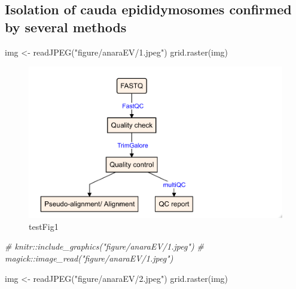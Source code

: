 \documentclass[12pt,twoside]{reedthesis}
\newenvironment{Shaded}{\begin{snugshade}}{\end{snugshade}}
\newcommand{\CommentTok}[1]{\textcolor[rgb]{0.56,0.35,0.01}{\textit{#1}}}
\newcommand{\FunctionTok}[1]{\textcolor[rgb]{0.00,0.00,0.00}{#1}}
\newcommand{\NormalTok}[1]{#1}
\newcommand{\OtherTok}[1]{\textcolor[rgb]{0.56,0.35,0.01}{#1}}
\newcommand{\StringTok}[1]{\textcolor[rgb]{0.31,0.60,0.02}{#1}}
\begin{document}
\hypertarget{isolation-of-cauda-epididymosomes-confirmed-by-several-methods}{%
\subsection{Isolation of cauda epididymosomes confirmed by several methods}\label{isolation-of-cauda-epididymosomes-confirmed-by-several-methods}}
\begin{Shaded}
\begin{Highlighting}[]
\NormalTok{img }\OtherTok{\textless{}{-}} \FunctionTok{readJPEG}\NormalTok{(}\StringTok{"figure/anaraEV/1.jpeg"}\NormalTok{)}
\FunctionTok{grid.raster}\NormalTok{(img)}
\end{Highlighting}
\end{Shaded}
\begin{figure}

{\centering \includegraphics{thesis_files/figure-latex/fig1-1} 

}

\caption{testFig1}\label{fig:fig1}
\end{figure}
\begin{Shaded}
\begin{Highlighting}[]
\CommentTok{\# knitr::include\_graphics("figure/anaraEV/1.jpeg")}
\CommentTok{\# magick::image\_read("figure/anaraEV/1.jpeg")}
\end{Highlighting}
\end{Shaded}
\begin{Shaded}
\begin{Highlighting}[]
\NormalTok{img }\OtherTok{\textless{}{-}} \FunctionTok{readJPEG}\NormalTok{(}\StringTok{"figure/anaraEV/2.jpeg"}\NormalTok{)}
\FunctionTok{grid.raster}\NormalTok{(img)}
\end{Highlighting}
\end{Shaded}
\end{document}
